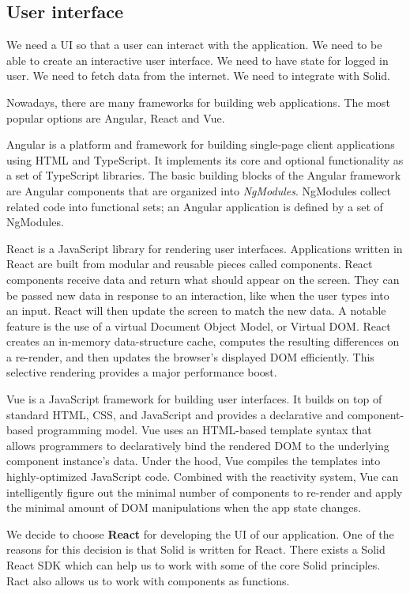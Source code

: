 \subsection*{User interface}
  We need a UI so that a user can interact with the application.
  We need to be able to create an interactive user interface.
  We need to have state for logged in user.
  We need to fetch data from the internet.
  We need to integrate with Solid.

  Nowadays, there are many frameworks for building web applications.
  The most popular options are Angular, React and Vue.

  Angular is a platform and framework for building single-page client applications using HTML and TypeScript. 
  It implements its core and optional functionality as a set of TypeScript libraries. 
  The basic building blocks of the Angular framework are Angular components that are organized into \emph{NgModules}. 
  NgModules collect related code into functional sets; an Angular application is defined by a set of NgModules.

  React is a JavaScript library for rendering user interfaces.
  Applications written in React are built from modular and reusable pieces called components.
  React components receive data and return what should appear on the screen. 
  They can be passed new data in response to an interaction, like when the user types into an input. 
  React will then update the screen to match the new data.
  A notable feature is the use of a virtual Document Object Model, or Virtual DOM. 
  React creates an in-memory data-structure cache, computes the resulting differences on a re-render, and then updates the browser's displayed DOM efficiently. 
  This selective rendering provides a major performance boost.

  Vue is a JavaScript framework for building user interfaces. 
  It builds on top of standard HTML, CSS, and JavaScript and provides a declarative and component-based programming model.
  Vue uses an HTML-based template syntax that allows programmers to declaratively bind the rendered DOM to the underlying component instance's data.
  Under the hood, Vue compiles the templates into highly-optimized JavaScript code. 
  Combined with the reactivity system, Vue can intelligently figure out the minimal number of components to re-render and apply the minimal amount of DOM manipulations when the app state changes.

  We decide to choose \textbf{React} for developing the UI of our application.
  One of the reasons for this decision is that Solid is written for React.
  There exists a Solid React SDK which can help us to work with some of the core Solid principles.
  Ract also allows us to work with components as functions.

